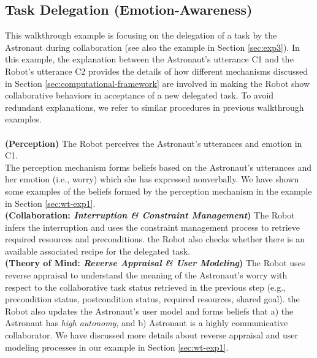 \subsection{Task Delegation (Emotion-Awareness)}
\label{sec:wt-exp3}

This walkthrough example is focusing on the delegation of a task by the
Astronaut during collaboration (see also the example in Section \ref{sec:exp3}).
In this example, the explanation between the Astronaut's utterance C1 and the
Robot's utterance C2 provides the details of how different mechanisms discussed
in Section \ref{sec:computational-framework} are involved in making the Robot 
show collaborative behaviors in acceptance of a new delegated task. To avoid
redundant explanations, we refer to similar procedures in previous walkthrough
examples.\\

\noindent{}\\

\noindent\textbf{(Perception)} The Robot perceives the Astronaut's utterances
and emotion in C1.\\

The perception mechanism forms beliefs based on the Astronaut's utterances and
her emotion (i.e., worry) which she has expressed nonverbally. We have shown
some examples of the beliefs formed by the perception mechanism in the example
in Section \ref{sec:wt-exp1}.\\

\noindent\textbf{(Collaboration: \textit{Interruption \& Constraint
Management})} The Robot infers the interruption and uses the constraint
management process to retrieve required resources and preconditions. the Robot
also checks whether there is an available associated recipe for the delegated
task.\\

\noindent\textbf{(Theory of Mind: \textit{Reverse Appraisal \& User Modeling})}
The Robot uses reverse appraisal to understand the meaning of the Astronaut's
worry with respect to the collaborative task status retrieved in the previous
step (e.g., precondition status, postcondition status, required resources,
shared goal). the Robot also updates the Astronaut's user model and forms
beliefs that a) the Astronaut has \textit{high autonomy}, and b) Astronaut is a
highly communicative collaborator. We have discussed more details about reverse
appraisal and user modeling processes in our example in Section
\ref{sec:wt-exp1}.\\

